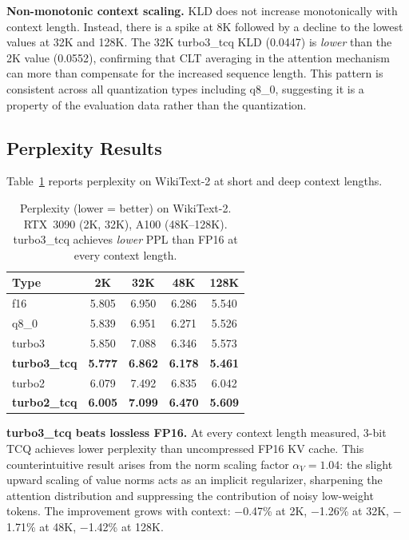 \documentclass{article}
\begin{document}
\textbf{Non-monotonic context scaling.} KLD does not increase monotonically
with context length. Instead, there is a spike at 8K followed by a decline
to the lowest values at 32K and 128K. The 32K turbo3\_tcq KLD (0.0447) is
\emph{lower} than the 2K value (0.0552), confirming that CLT averaging in the
attention mechanism can more than compensate for the increased sequence length.
This pattern is consistent across all quantization types including q8\_0,
suggesting it is a property of the evaluation data rather than the quantization.

\subsection{Perplexity Results}
\label{sec:ppl_results}

Table~\ref{tab:ppl} reports perplexity on WikiText-2 at short and deep
context lengths.

\begin{table}[t]
\centering
\caption{Perplexity (lower = better) on WikiText-2. RTX~3090 (2K, 32K),
A100 (48K--128K). turbo3\_tcq achieves \emph{lower} PPL than FP16 at every
context length.}
\label{tab:ppl}
\begin{tabular}{@{}lcccc@{}}
\toprule
Type & 2K & 32K & 48K & 128K \\
\midrule
f16         & 5.805 & 6.950 & 6.286 & 5.540 \\
q8\_0       & 5.839 & 6.951 & 6.271 & 5.526 \\
turbo3      & 5.850 & 7.088 & 6.346 & 5.573 \\
\textbf{turbo3\_tcq} & \textbf{5.777} & \textbf{6.862} & \textbf{6.178} & \textbf{5.461} \\
turbo2      & 6.079 & 7.492 & 6.835 & 6.042 \\
\textbf{turbo2\_tcq} & \textbf{6.005} & \textbf{7.099} & \textbf{6.470} & \textbf{5.609} \\
\bottomrule
\end{tabular}
\end{table}

\textbf{turbo3\_tcq beats lossless FP16.} At every context length measured,
3-bit TCQ achieves lower perplexity than uncompressed FP16 KV cache. This
counterintuitive result arises from the norm scaling factor $\alpha_V = 1.04$:
the slight upward scaling of value norms acts as an implicit regularizer,
sharpening the attention distribution and suppressing the contribution of
noisy low-weight tokens. The improvement grows with context: $-$0.47\% at 2K,
$-$1.26\% at 32K, $-$1.71\% at 48K, $-$1.42\% at 128K.
\end{document}
